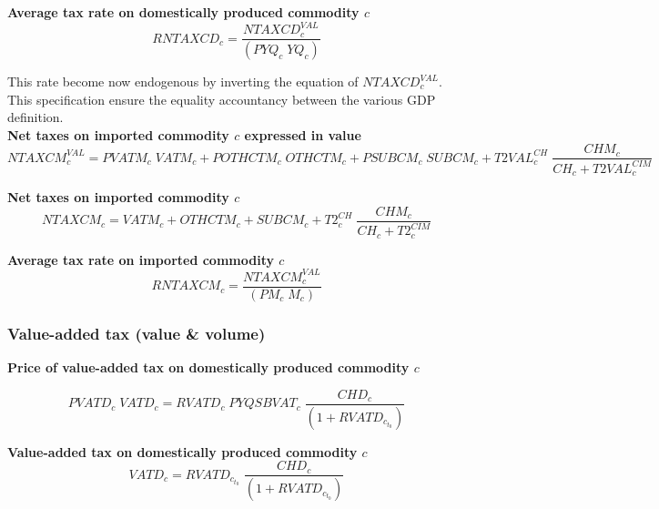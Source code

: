 \documentclass[12pt]{article}
\numberwithin{equation}{section}
\begin{document}
\noindent \textbf{Average tax rate on domestically produced commodity $c$} 
\begin{dmath}
RNTAXCD_{c} = \frac{NTAXCD^{VAL}_{c}}{\left( PYQ_{c} \; YQ_{c} \right)}
\label{Exception_taxes_prices.mdlRNTAXCD[c]}
\end{dmath}

This rate become now endogenous by inverting the equation of $NTAXCD^{VAL}_{c}$. This specification ensure the equality accountancy between the various GDP definition. \\

\noindent \textbf{Net taxes on imported commodity $c$ expressed in value} 
\begin{dmath}
NTAXCM^{VAL}_{c} = PVATM_{c} \; VATM_{c} + POTHCTM_{c} \; OTHCTM_{c} + PSUBCM_{c} \; SUBCM_{c} + T2VAL^{CH}_{c} \; \frac{CHM_{c}}{CH_{c} + T2VAL^{CIM}_{c}}
\label{Exception_taxes_prices.mdlNTAXCM_VAL[c]}
\end{dmath}

\noindent \textbf{Net taxes on imported commodity $c$} 
\begin{dmath}
NTAXCM_{c} = VATM_{c} + OTHCTM_{c} + SUBCM_{c} + T2^{CH}_{c} \; \frac{CHM_{c}}{CH_{c} + T2^{CIM}_{c}}
\label{Exception_taxes_prices.mdlNTAXCM[c]}
\end{dmath}

\noindent \textbf{Average tax rate on imported commodity $c$} 
\begin{dmath}
RNTAXCM_{c} = \frac{NTAXCM^{VAL}_{c}}{\left( PM_{c} \; M_{c} \right)}
\label{Exception_taxes_prices.mdlRNTAXCM[c]}
\end{dmath}



\subsubsection{Value-added tax (value \& volume)}



\noindent \textbf{Price of value-added tax on domestically produced commodity $c$} 

\begin{dmath}
PVATD_{c} \; VATD_{c} = RVATD_{c} \; PYQSBVAT_{c} \; \frac{CHD_{c}}{\left( 1 + RVATD_{c}_{t_0} \right)}
\label{Exception_taxes_prices.mdlPVATD[c]}
\end{dmath}

\noindent \textbf{Value-added tax on domestically produced commodity $c$} 
\begin{dmath}
VATD_{c} = RVATD_{c}_{t_0} \; \frac{CHD_{c}}{\left( 1 + RVATD_{c}_{t_0} \right)}
\label{Exception_taxes_prices.mdlVATD[c]}
\end{dmath}
\end{document}
